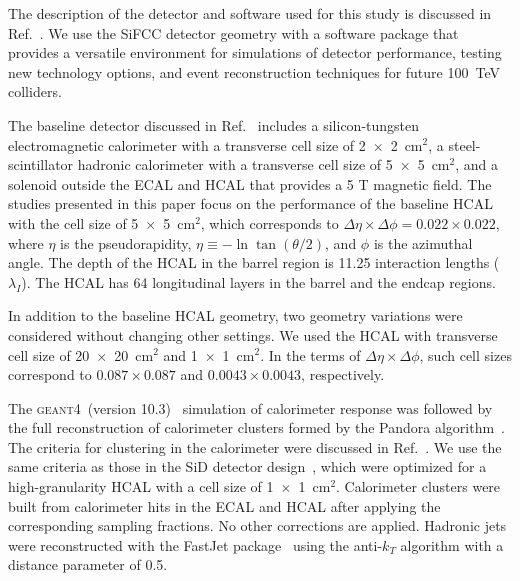 \documentclass[final,1p,11pt]{elsarticle}
\newcommand{\GEANTfour} {\textsc{geant4}}
\begin{document}
The description of the detector and software used for this study is discussed in Ref.~\cite{Chekanov:2016ppq}.
We use the SiFCC detector geometry with a software package that provides a versatile environment for simulations
of detector performance, testing new technology options, and event reconstruction techniques for future
100~TeV colliders.


The baseline detector discussed in Ref.~\cite{Chekanov:2016ppq}
includes a silicon-tungsten electromagnetic calorimeter with a transverse cell size of 2~$\times$~2~cm$^2$, a steel-scintillator hadronic calorimeter with a transverse cell size of 5~$\times$~5~cm$^2$, and a solenoid outside the ECAL and HCAL that provides a 5 T magnetic field. The studies presented in this paper focus on the performance of  the 
baseline HCAL with the cell size of 5~$\times$~5~cm$^2$, which corresponds to $\Delta \eta \times \Delta \phi = 0.022\times0.022$, where $\eta$ is the pseudorapidity, $\eta \equiv -\ln\tan(\theta/2)$, and $\phi$ is the azimuthal angle.
The depth of the HCAL in the barrel region is 11.25 interaction lengths ($\lambda_I$).
The HCAL has 64 longitudinal layers in the barrel and the endcap regions.

In addition to the baseline HCAL geometry,
two geometry variations were considered without changing other settings. 
We used the HCAL with transverse cell size of
20~$\times$~20~cm$^2$ and  1~$\times$~1~cm$^2$.
In the terms of $\Delta \eta \times \Delta \phi$,  such cell sizes correspond to
$0.087\times0.087$ and  $0.0043\times0.0043$, respectively.

The \GEANTfour\ (version 10.3)~\cite{Allison2016186} simulation of calorimeter response was followed by the full reconstruction of calorimeter clusters formed by the Pandora algorithm~\cite{Charles:2009ta,Marshall:2013bda}. The criteria for clustering in the calorimeter were discussed in Ref.~\cite{THOMSON200925}. We use the same criteria as those in the SiD detector design~\cite{Behnke:2013lya}, which were optimized for a high-granularity HCAL with a cell size of 1~$\times$~1~cm$^2$.
Calorimeter clusters were built from calorimeter hits in the  ECAL and HCAL after applying the corresponding sampling fractions. No other corrections are applied.
Hadronic jets were 
reconstructed with the {\sc FastJet} package~\cite{fastjet} using the anti-$k_T$ algorithm \cite{Cacciari:2008gp}
with  a distance parameter of 0.5. 
\end{document}
